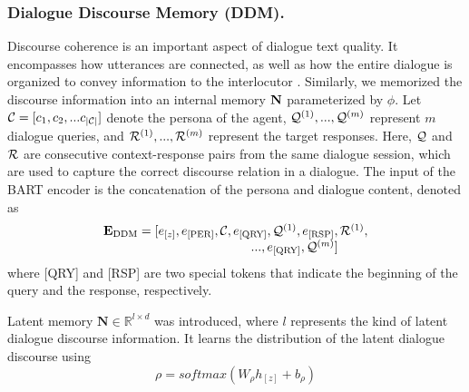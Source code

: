 \documentclass[letterpaper]{article} \usepackage{aaai23}  \usepackage{times}  \usepackage{helvet}  \usepackage{courier}  \usepackage[hyphens]{url}  \usepackage{graphicx} \urlstyle{rm} \def\UrlFont{\rm}  \usepackage{natbib}  \usepackage{caption} \frenchspacing  \setlength{\pdfpagewidth}{8.5in}  \setlength{\pdfpageheight}{11in}  \usepackage{algorithm}
\begin{document}
\subsubsection{Dialogue Discourse Memory (DDM).}
Discourse coherence is an important aspect of dialogue text quality. It encompasses how utterances are connected, as well as how the entire dialogue is organized to convey information to the interlocutor \cite{Bao2020}. Similarly, we memorized the discourse information into an internal memory ${\bf{N}}$ parameterized by $\phi$. Let ${\cal C} = [{c_1},{c_2},...{c_{{\rm{|}}{\cal C}{\rm{|}}}}]$ denote the persona of the agent, ${{\cal Q}^{(1)}},...,{{\cal Q}^{(m)}}$ represent $m$ dialogue queries, and ${{\cal R}^{(1)}},...,{{\cal R}^{(m)}}$ represent the target responses. Here, ${\cal Q}$ and ${\cal R}$ are consecutive context-response pairs from the same dialogue session, which are used to capture the correct discourse relation in a dialogue. The input of the BART encoder is the concatenation of the persona and dialogue content, denoted as 
\begin{equation}
\begin{array}{l}
{{\bf{E}}_{{\rm{DDM}}}} = [{e_{[z]}},{e_{{\rm{[PER]}}}},{\cal C},{e_{{\rm{[QRY]}}}},{{\cal Q}^{(1)}},{e_{{\rm{[RSP]}}}},{{\cal R}^{(1)}},\\
\;\;\;\;\;\;\;\;\;\;\;\;\;\;\;\;\;\;\;\;\;\;\;\;\;\;\;\;\;\;\;\;\;\;\;\;\;\;\;\;\;\;...,{e_{{\rm{[QRY]}}}},{{\cal Q}^{(m)}}]
\end{array}
\label{eq8}
\end{equation}
where \rm{[QRY]} and \rm{[RSP]} are two special tokens that indicate the beginning of the query and the response, respectively.

Latent memory ${\mathbf{N}} \in {\mathbb{R}^{l \times d}}$ was introduced, where $l$ represents the kind of latent dialogue discourse information. It learns the distribution of the latent dialogue discourse using
\begin{equation}
\rho  = softmax({W_\rho }{h_{[z]}} + {b_\rho })
\label{eq9}
\end{equation}
\end{document}
